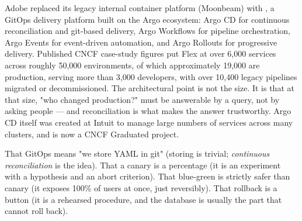  Adobe replaced its legacy internal container platform (Moonbeam) with , a GitOps delivery platform built on the Argo ecosystem: Argo CD for continuous reconciliation and git-based delivery, Argo Workflows for pipeline orchestration, Argo Events for event-driven automation, and Argo Rollouts for progressive delivery. Published CNCF case-study figures put Flex at over 6{,}000 services across roughly 50{,}000 environments, of which approximately 19{,}000 are production, serving more than 3{,}000 developers, with over 10{,}400 legacy pipelines migrated or decommissioned. The architectural point is not the size. It is that at that size, "who changed production?" must be answerable by a query, not by asking people --- and reconciliation is what makes the answer trustworthy. Argo CD itself was created at Intuit to manage large numbers of services across many clusters, and is now a CNCF Graduated project.

 That GitOps means "we store YAML in git" (storing is trivial; \emph{continuous reconciliation} is the idea). That a canary is a percentage (it is an experiment with a hypothesis and an abort criterion). That blue-green is strictly safer than canary (it exposes 100\% of users at once, just reversibly). That rollback is a button (it is a rehearsed procedure, and the database is usually the part that cannot roll back).


